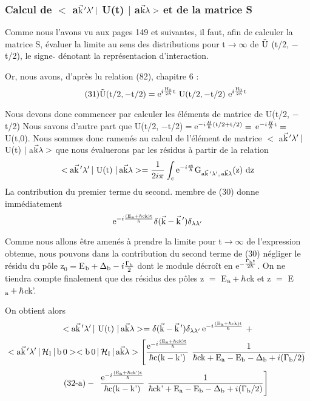 \subsubsection{Calcul de $<$ a$\vec{\text{k}}\,'\lambda'\,|$ U(t) $|$ a$\vec{\text{k}}\lambda>$ et de la matrice S}%
Comme nous l'avons vu aux pages 149 et suivantes, il faut,
afin de calculer la matrice S, évaluer la limite au sens des distributions
pour t$\to\infty$ de $\tilde{\text{U}}$ (t/2, $-$t/2), le signe $\tilde{ }$ dénotant la représentacion d'interaction.

Or, nous avons, d'après lu relation (82), chapitre 6 :
\[
\tag{31}\tilde{\mt{U}}(\mt{t}/2,-\mt{t}/2)=\mt{e}^{i\frac{\mt{H}_0}{2\hbar}\mt{t}}
\ \mt{U}(\mt{t}/2,-\mt{t}/2)\ \mt{e}^{i\frac{\mt{H}_0}{2\hbar}\mt{t}}
\]

Nous devons done commencer par calculer les éléments de matrice de U(t/2, $-$t/2)
Nous savons d'autre part que U(t/2, $-$t/2)$=$e$^{-i\frac{H}{\hbar}(\text{t}/2+\text{t}/2)}=$
e$^{-i\frac{H}{\hbar}\text{t}}=$U(t,0).
Nous sommes donc ramenés au calcul de l'élément de matrice
$<$ a$\vec{\text{k}}\,'\lambda'\,|$ U(t) $|$ a$\vec{\text{k}}\lambda>$
que nous évaluerons par les résidus à partir de la relation
\[
<\text{a}\vec{\text{k}}\,'\lambda'\,|\text{ U(t) }|\,\text{a}\vec{\text{k}}\lambda>=\frac{1}{2i\pi}\int_{\text{c}}\text{e}
^{-i\frac{\text{zt}}{\hbar}}\text{G}_{\text{a}\vec{\text{k}}\,'\lambda',\,\text{a}\vec{\text{k}}\lambda}\text{(z) dz}
\]
La contribution du premier terme du second. membre de (30) donne immédiatement
\[
\text{e}^{-i\frac{(\text{E}_{\text{a}}+\hbar\text{ck)t}}{\hbar}}\delta(\vec{\text{k}}-\vec{\text{k}}\,')\delta_{\lambda\lambda'}
\]

Comme nous allons être amenés à prendre la limite pour t$\to\infty$
de l'expression obtenue, nous pouvons dans la contribution du second terme de
(30) négliger le résidu du pôle z$_0=$E$_{\text{b}}+\Delta_{\text{b}}-i\frac{\Gamma_{\text{b}}}{2}$
dont le module décroît en e$^{-\frac{\Gamma_{\text{b}}\text{t}}{2\hbar}}$.
On ne tiendra compte finalement que des résidus des pôles z $=$ E$_{\text{a}}+\hbar$ck et z $=$ E$_{\text{a}}+\hbar$ck'.

On obtient alors
\[
<\text{a}\vec{\text{k}}\,'\lambda'\,|\text{ U(t) }|\,\text{a}\vec{\text{k}}\lambda>=
\delta(\vec{\text{k}}-\vec{\text{k}}\,')\delta_{\lambda\lambda'}
\,\text{e}^{-i\frac{(\text{E}_{\text{a}}+\hbar\text{ck)t}}{\hbar}}\ +
\]
\[
<\mt{a}\vec{\mt{k}}\,'\lambda'\,|\,\mc{H}_\mt{I}\,|\,\mt{b}\,0 >
<\mt{b}\,0\,|\,\mc{H}_\mt{I}\,|\,\mt{a}\vec{\mt{k}}\lambda>\left[
\frac{\mt{e}^{-i\frac{(\mt{E}_\mt{a}+\hbar\mt{ck)t}}{\hbar}}}{\hbar\mt{c(k}-\mt{k')}}
\ \frac{1}{\hbar\mt{ck}+\mt{E}_\mt{a}-\mt{E}_\mt{b}-\Delta_\mt{b}+i(\Gamma_\mt{b}/2)}
\right .
\]
\[
\tag{32-a}-\ \left.
\frac{\mt{e}^{-i\frac{(\mt{E}_\mt{a}+\hbar\mt{ck')t}}{\hbar}}}{\hbar\mt{c(k}-\mt{k')}}
\ \frac{1}{\hbar\mt{ck'}+\mt{E}_\mt{a}-\mt{E}_\mt{b}-\Delta_\mt{b}+i(\Gamma_\mt{b}/2)}
\right]
\]

